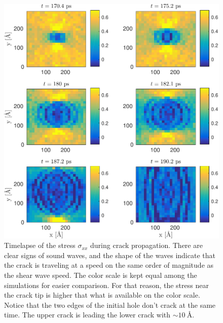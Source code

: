 \begin{figure}
\includegraphics[width=\textwidth]{../figures/thesis/stressfield_timelapse.pdf}
\caption{Timelapse of the stress $\sigma_{xx}$ during crack propagation. There are clear signs of sound waves, and the shape of the waves indicate that the crack is traveling at a speed on the same order of magnitude as the shear wave speed. The color scale is kept equal among the simulations for easier comparison. For that reason, the stress near the crack tip is higher that what is available on the color scale. Notice that the two edges of the initial hole don't crack at the same time. The upper crack is leading the lower crack 
with $\sim \SI{10}{\angstrom}$. }
\label{fig:stressfield_timelapse}
\end{figure}




